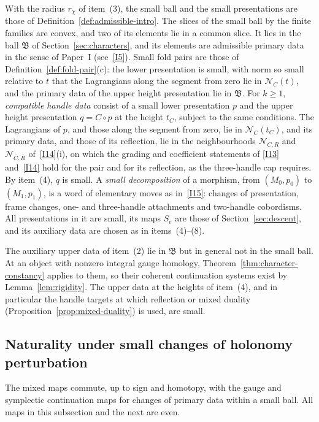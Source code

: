 \documentclass[11pt]{amsart}
\theoremstyle{definition}
\theoremstyle{remark}
\theoremstyle{plain}
\numberwithin{equation}{section}
\begin{document}
With the radius $r_\chi$ of item~(3), the
small ball and the small presentations
are those of Definition~\ref{def:admissible-intro}.
The slices of the small ball by the finite
families are convex, and two of its elements lie
in a common slice. It lies in the ball
$\mathfrak B$ of Section~\ref{sec:characters},
and its elements are admissible primary data in
the sense of Paper~I (see~\ref{I5}). Small
fold pairs are those of
Definition~\ref{def:fold-pair}(c): the lower
presentation is small, with norm so small relative to
$t$ that the Lagrangians along the segment from zero
lie in $\mathcal N_C(t)$, and the primary data of the
upper height presentation lie in $\mathfrak B$.
For $k\ge1$,
\emph{compatible handle data} consist of a
small lower presentation $p$ and the upper
height presentation $q=C\circ p$ at the height
$t_C$, subject to the same conditions. The
Lagrangians of $p$, and those along the segment
from zero, lie in $\mathcal N_C(t_C)$,
and its primary data, and those of its reflection,
lie in the neighbourhoods $\mathcal N_{C,R}$ and
$\mathcal N_{\bar C,\bar R}$ of~\ref{I14}(i), on
which the grading and coefficient statements of
\ref{I13} and~\ref{I14} hold for the pair and for
its reflection, as the three-handle cap requires.
By item~(4), $q$ is small.
A \emph{small decomposition} of a morphism,
from $(M_0,p_0)$ to $(M_1,p_1)$, is a word of
elementary moves as in~\ref{I15}:
changes of presentation, frame changes, one- and
three-handle attachments and two-handle
cobordisms. All presentations in it are
small, its maps $S_e$ are those of
Section~\ref{sec:descent}, and its auxiliary data
are chosen as in items~(4)--(8).

The auxiliary upper data of item~(2) lie in
$\mathfrak B$ but in general not in the
small ball. At an object with nonzero
integral gauge homology,
Theorem~\ref{thm:character-constancy} applies to
them, so their coherent continuation
systems exist by Lemma~\ref{lem:rigidity}. The
upper data at the heights of item~(4), and in
particular the handle targets at which
reflection or mixed duality
(Proposition~\ref{prop:mixed-duality}) is used,
are small.

\subsection{Naturality under small changes of holonomy perturbation}
The mixed maps commute, up to sign and
homotopy, with the gauge and symplectic
continuation maps for changes of primary data
within a small ball. All maps in this
subsection and the next are even.
\end{document}
